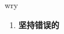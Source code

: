 
\begin{frame}
{\huge wry}
\begin{center}
\begin{enumerate}\Large
  \item \textbf{坚持错误的}
\end{enumerate}
\end{center}
\end{frame}
